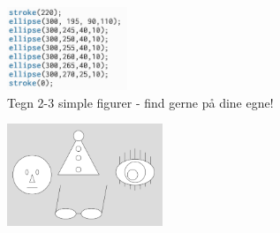 \documentclass{ucph-handout}
\begin{document}
\begin{exercisebox}[adjusted title=Før vi rigtig starter]
\vspace{3mm}
\quad\quad\quad\quad\quad\quad\quad\quad\quad\quad\quad\quad\includegraphics[width=0.27\textwidth]{nyebilleder/bulb.png} \\

\vspace{3mm}
Tegn 2-3 simple figurer - find gerne på dine egne!

\vspace{3mm}
\quad\quad\includegraphics[width=0.35\textwidth]{nyebilleder/figurer.png} 

\end{exercisebox}

\newpage
\end{document}
